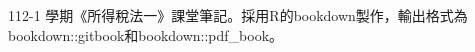 
\thispagestyle{empty}

\mbox{}
\vspace{10cm}
\begin{center}

    112-1 學期《所得稅法一》課堂筆記。採用R的bookdown製作，輸出格式為bookdown::gitbook和bookdown::pdf\_book。
    
\end{center}

\setlength{\abovedisplayskip}{-5pt}
\setlength{\abovedisplayshortskip}{-5pt}
